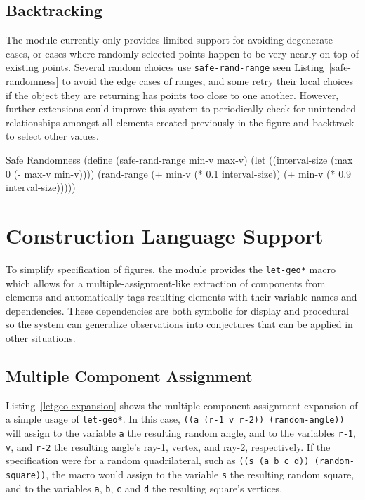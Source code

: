 \subsection{Backtracking}

The module currently only provides limited support for avoiding
degenerate cases, or cases where randomly selected points happen to be
very nearly on top of existing points. Several random choices use
\texttt{safe-rand-range} seen Listing~\ref{safe-randomness} to avoid
the edge cases of ranges, and some retry their local choices if the
object they are returning has points too close to one
another. However, further extensions could improve this system to
periodically check for unintended relationships amongst all elements
created previously in the figure and backtrack to select other values.

\begin{code-listing}
[label=safe-randomness]
{Safe Randomness}
(define (safe-rand-range min-v max-v)
  (let ((interval-size (max 0 (- max-v min-v))))
    (rand-range
     (+ min-v (* 0.1 interval-size))
     (+ min-v (* 0.9 interval-size)))))
\end{code-listing}

\section{Construction Language Support}

To simplify specification of figures, the module provides the
\texttt{let-geo*} macro which allows for a multiple-assignment-like
extraction of components from elements and automatically tags
resulting elements with their variable names and dependencies. These
dependencies are both symbolic for display and procedural so the
system can generalize observations into conjectures that can be
applied in other situations.

\subsection{Multiple Component Assignment}

Listing~\ref{letgeo-expansion} shows the multiple component assignment
expansion of a simple usage of \texttt{let-geo*}. In this case,
\texttt{((a (r-1 v r-2)) (random-angle))} will assign to the variable
\texttt{a} the resulting random angle, and to the variables
\texttt{r-1}, \texttt{v}, and \texttt{r-2} the resulting angle's
ray-1, vertex, and ray-2, respectively. If the specification were for
a random quadrilateral, such as \texttt{((s (a b c d))
  (random-square))}, the macro would assign to the variable \texttt{s}
the resulting random square, and to the variables \texttt{a},
\texttt{b}, \texttt{c} and \texttt{d} the resulting square's vertices.

